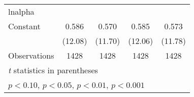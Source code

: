 \begin{table}[htbp]
\begin{tabular}{l*{4}{c}}
\midrule
lnalpha             &                     &                     &                     &                     \\
Constant            &       0.586\sym{***}&       0.570\sym{***}&       0.585\sym{***}&       0.573\sym{***}\\
                    &     (12.08)         &     (11.70)         &     (12.06)         &     (11.78)         \\
\midrule
Observations        &        1428         &        1428         &        1428         &        1428         \\
\bottomrule
\multicolumn{5}{l}{\footnotesize \textit{t} statistics in parentheses}\\
\multicolumn{5}{l}{\footnotesize \sym{+} \(p<0.10\), \sym{*} \(p<0.05\), \sym{**} \(p<0.01\), \sym{***} \(p<0.001\)}\\
\end{tabular}
\end{table}
